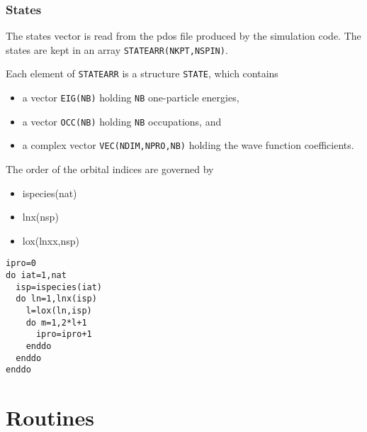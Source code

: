 \documentclass[11pt,a4paper]{report}
\begin{document}
\subsection{States}
The states vector is read from the pdos file produced by the
simulation code.  The states are kept in an array
\verb|STATEARR(NKPT,NSPIN)|.


Each element of \verb|STATEARR| is a structure \verb|STATE|, which
contains
\begin{itemize}
\item a vector \verb|EIG(NB)| holding \verb|NB|
one-particle energies, 
\item a vector \verb|OCC(NB)| holding \verb|NB|
occupations, and 
\item a complex vector \verb|VEC(NDIM,NPRO,NB)| holding the wave
function coefficients.
\end{itemize}

The order of the orbital indices are governed by 
\begin{itemize}
\item ispecies(nat)
\item lnx(nsp)
\item lox(lnxx,nsp)
\end{itemize}

\begin{verbatim}
ipro=0
do iat=1,nat
  isp=ispecies(iat)
  do ln=1,lnx(isp)
    l=lox(ln,isp)
    do m=1,2*l+1
      ipro=ipro+1
    enddo
  enddo
enddo
\end{verbatim}


\chapter{Routines}
\cite{bloechl94_prb50_17953}
\end{document}
